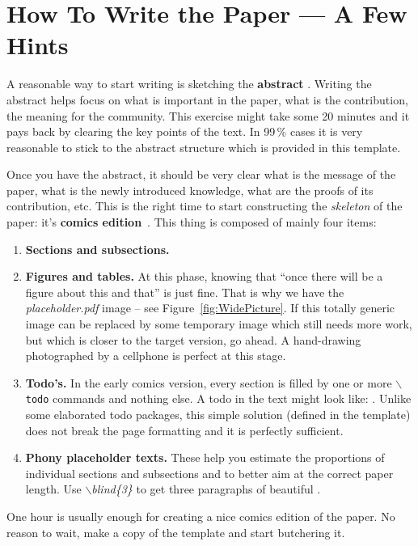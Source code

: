 \documentclass{ExcelAtFIT}
\begin{document}
\section{How To Write the Paper --- A Few Hints}
\label{sec:HowToWrite}

A reasonable way to start writing is sketching the \textbf{abstract} \cite{Herout-Abstract}.  Writing the abstract helps focus on what is important in the paper, what is the contribution, the meaning for the community.  This exercise might take some 20 minutes and it pays back by clearing the key points of the text.
In 99\,\% cases it is very reasonable to stick to the abstract structure \cite{Lebrun2011} which is provided in this template.

Once you have the abstract, it should be very clear what is the message of the paper, what is the newly introduced knowledge, what are the proofs of its contribution, etc.  This is the right time to start constructing the \emph{skeleton} of the paper: it's \textbf{comics edition}~\cite{Herout-Comics}.
This thing is composed of mainly four items:
\begin{enumerate} [noitemsep]
	\item \textbf{Sections and subsections.}
	\item \textbf{Figures and tables.}  At this phase, knowing that ``once there will be a figure about this and that'' is just fine.  That is why we have the \textit{placeholder.pdf} image -- see Figure~\ref{fig:WidePicture}.  If this totally generic image can be replaced by some temporary image which still needs more work, but which is closer to the target version, go ahead. A hand-drawing photographed by a cellphone is perfect at this stage.
	\item \textbf{Todo's.} In the early comics version, every section is filled by one or more \texttt{$\backslash$todo} commands and nothing else.  A todo in the text might look like: .  Unlike some elaborated todo packages, this simple solution (defined in the template) does not break the page formatting and it is perfectly sufficient.
	\item \textbf{Phony placeholder texts.}  These help you estimate the proportions of individual sections and subsections and to better aim at the correct paper length. Use \textit{$\backslash$blind\{3\}} to get three paragraphs of beautiful .
\end{enumerate}
One hour is usually enough for creating a nice comics edition of the paper.  No reason to wait, make a copy of the template and start butchering it.
\end{document}
